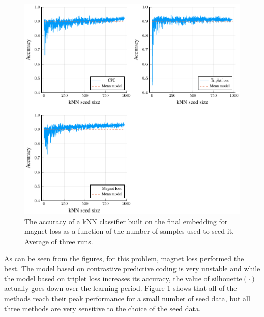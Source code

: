 \begin{figure}[h]
  \centering
  \includegraphics[width=\textwidth]{images/cisco/kNN/cisco-kNN.pdf}
  \caption{The accuracy of a kNN classifier built on the final embedding for magnet loss as a function of the number of samples used to seed it. Average of three runs.}\label{fig:cisco-kNN}
\end{figure}

As can be seen from the figures, for this problem, magnet loss performed the best. The model based on contrastive predictive coding is very unstable and while the model based on triplet loss increases its accuracy, the value of \( \mathrm{silhouette} \left( \cdot \right) \) actually goes down over the learning period. Figure \ref{fig:cisco-kNN} shows that all of the methods reach their peak performance for a small number of seed data, but all three methods are very sensitive to the choice of the seed data. 

